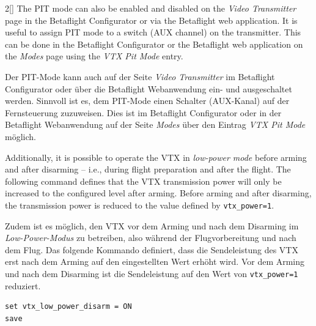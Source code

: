 \begin{paracol}{2}[]
The PIT mode can also be enabled and disabled on the \textsl{Video Transmitter} page in the Betaflight Configurator or via the Betaflight web application. It is useful to assign PIT mode to a switch (AUX channel) on the transmitter. This can be done in the Betaflight Configurator or the Betaflight web application on the \textsl{Modes} page using the \textsl{VTX Pit Mode} entry.

\colger

Der PIT-Mode kann auch auf der Seite \textsl{Video Transmitter} im Betaflight Configurator oder über die Betaflight Webanwendung ein- und ausgeschaltet werden. Sinnvoll ist es, dem PIT-Mode einen Schalter (AUX-Kanal) auf der Fernsteuerung zuzuweisen. Dies ist im Betaflight Configurator oder in der Betaflight Webanwendung auf der Seite \textsl{Modes} über den Eintrag \textsl{VTX Pit Mode} möglich.

\coleng

Additionally, it is possible to operate the VTX in \textsl{low-power mode} before arming and after disarming -- i.e., during flight preparation and after the flight. The following command defines that the VTX transmission power will only be increased to the configured level after arming. Before arming and after disarming, the transmission power is reduced to the value defined by \verb!vtx_power=1!.

\colger

Zudem ist es möglich, den VTX vor dem Arming und nach dem Disarming im \textsl{Low-Power-Modus} zu betreiben, also während der Flugvorbereitung und nach dem Flug. Das folgende Kommando definiert, dass die Sendeleistung des VTX erst nach dem Arming auf den eingestellten Wert erhöht wird. Vor dem Arming und nach dem Disarming ist die Sendeleistung auf den Wert von \verb!vtx_power=1! reduziert.

\colende


\begin{lstlisting}[style=shell]
set vtx_low_power_disarm = ON
save
\end{lstlisting}


\end{paracol}

